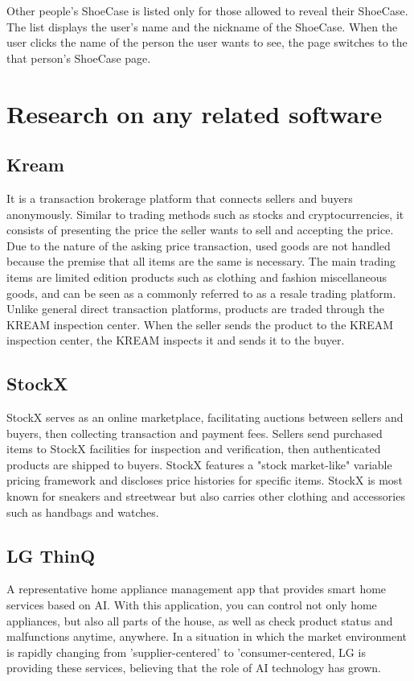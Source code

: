 \documentclass[conference]{IEEEtran}
\begin{document}
Other people's ShoeCase is listed only for those allowed to reveal their ShoeCase. The list displays the user's name and the nickname of the ShoeCase. When the user clicks the name of the person the user wants to see, the page switches to the that person's ShoeCase page.


\section{Research on any related software}

\subsection{Kream}

It is a transaction brokerage platform that connects sellers and buyers anonymously. Similar to trading methods such as stocks and cryptocurrencies, it consists of presenting the price the seller wants to sell and accepting the price. Due to the nature of the asking price transaction, used goods are not handled because the premise that all items are the same is necessary. The main trading items are limited edition products such as clothing and fashion miscellaneous goods, and can be seen as a commonly referred to as a resale trading platform. Unlike general direct transaction platforms, products are traded through the KREAM inspection center. When the seller sends the product to the KREAM inspection center, the KREAM inspects it and sends it to the buyer.

\subsection{StockX}

StockX serves as an online marketplace, facilitating auctions between sellers and buyers, then collecting transaction and payment fees. Sellers send purchased items to StockX facilities for inspection and verification, then authenticated products are shipped to buyers. StockX features a "stock market-like" variable pricing framework and discloses price histories for specific items. StockX is most known for sneakers and streetwear but also carries other clothing and accessories such as handbags and watches.

\subsection{LG ThinQ}

A representative home appliance management app that provides smart home services based on AI. With this application, you can control not only home appliances, but also all parts of the house, as well as check product status and malfunctions anytime, anywhere. In a situation in which the market environment is rapidly changing from 'supplier-centered' to 'consumer-centered, LG is providing these services, believing that the role of AI technology has grown.
\end{document}
